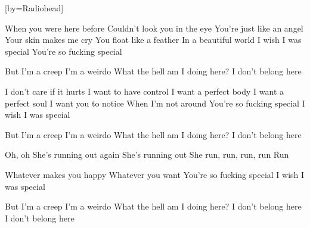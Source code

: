 [by={Radiohead}]

  \chordsoff

  \beginverse
  When you were here before
  Couldn't look you in the eye
  You're just like an angel
  Your skin makes me cry
  You float like a feather
  In a beautiful world
  I wish I was special
  You're so fucking special
  \endverse
  
  \beginchorus
  But I'm a creep
  I'm a weirdo
  What the hell am I doing here?
  I don't belong here
  \endchorus

  \beginverse
  I don't care if it hurts
  I want to have control
  I want a perfect body
  I want a perfect soul
  I want you to notice
  When I'm not around
  You're so fucking special
  I wish I was special
  \endverse
  
  \beginchorus
  But I'm a creep
  I'm a weirdo
  What the hell am I doing here?
  I don't belong here
  \endchorus

  \beginverse
  Oh, oh
  She's running out again
  She's running out
  She run, run, run, run
  Run

  Whatever makes you happy
  Whatever you want
  You're so fucking special
  I wish I was special
  \endverse
  
  \beginchorus
  But I'm a creep
  I'm a weirdo
  What the hell am I doing here?
  I don't belong here
  I don't belong here
  \endchorus
\endsong
